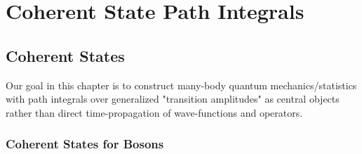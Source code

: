 \documentclass[../classnotes.tex]{subfiles}
\begin{document}
\chapter{Coherent State Path Integrals}

\section{Coherent States}

Our goal in this chapter is to construct many-body quantum mechanics/statistics with path integrals over generalized "transition amplitudes" as central objects rather than direct time-propagation of wave-functions and operators.

\subsection{Coherent States for Bosons}
\end{document}
